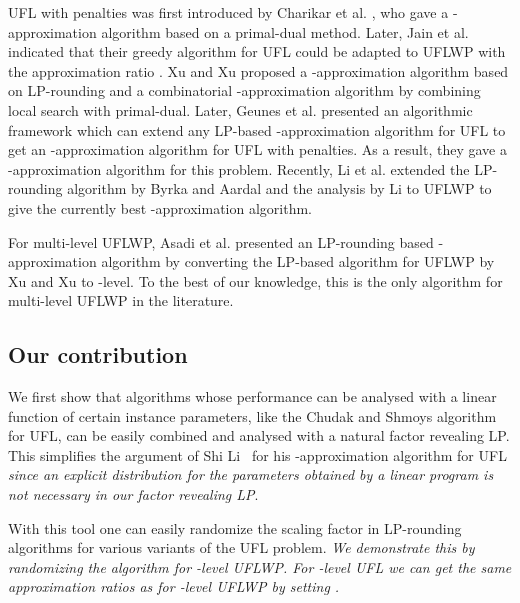 \documentclass{llncs}
\newcommand{\va}[1]{{\color{black}\sl  #1}}
\begin{document}
UFL with penalties was first introduced by Charikar et al. \cite{Charikar}, who gave a -approximation algorithm based on a primal-dual method. Later, Jain et al. \cite{Jain} indicated that their greedy algorithm for UFL could be adapted to UFLWP with the approximation ratio . Xu and Xu \cite{Xu:2005,Xu:2009} proposed a -approximation algorithm based on LP-rounding and a combinatorial -approximation algorithm by combining local search with primal-dual. Later, Geunes et al. \cite{Geunes} presented an algorithmic framework which can extend any LP-based -approximation algorithm for UFL to get an -approximation algorithm for UFL with penalties. As a result, they gave a -approximation algorithm for this problem. Recently, Li et al. \cite{YuLi} extended the LP-rounding algorithm by Byrka and Aardal \cite{Byrka} and the analysis by Li \cite{ShiLi} to UFLWP to give the currently best -approximation algorithm.

For multi-level UFLWP, Asadi et al. \cite{Asadi} presented an LP-rounding based -approximation algorithm by converting the LP-based algorithm for UFLWP by Xu and Xu \cite{Xu:2005} to -level. To the best of our knowledge, this is the only algorithm for multi-level UFLWP in the literature.

\subsection{Our contribution}

We first show that algorithms whose performance can be analysed with a linear function of certain instance parameters, like the Chudak and Shmoys algorithm \cite{Chudak} for UFL, can be easily combined and analysed with a natural factor revealing LP. This simplifies the argument of Shi Li~\cite{ShiLi} for his -approximation algorithm for UFL \va{since an explicit distribution for the parameters obtained by a linear program is not necessary in our factor revealing LP}.

With this tool one can easily randomize the scaling factor in LP-rounding algorithms for various variants of the UFL problem. \va{We demonstrate this by randomizing the algorithm for -level UFLWP. For -level UFL we can get the same approximation ratios as for -level UFLWP by setting .}
\end{document}
